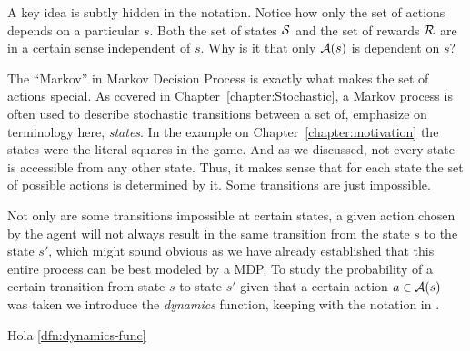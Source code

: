 A key idea is subtly hidden in the notation. Notice how only 
the set of actions depends on a particular $s$. Both the set of 
states $\mathcal{S}$ and the set of rewards $\mathcal{R}$ are in a 
certain sense independent of $s$. Why is it that only 
$\mathcal{A}(s)$ is dependent on $s$?

The ``Markov'' in Markov Decision Process is exactly what makes 
the set of actions special. As covered in 
Chapter~\ref{chapter:Stochastic}, a Markov process is often 
used to describe stochastic transitions between a set of, 
emphasize on terminology here, \textit{states}. In the example 
on Chapter~\ref{chapter:motivation} the states were the literal 
squares in the game. And as we discussed, not every state is 
accessible from any other state. Thus, it makes sense that for 
each state the set of possible actions is determined by it. 
Some transitions are just impossible.

Not only are some transitions impossible at certain states, a 
given action chosen by the agent will not always result in the 
same transition from the state $s$ to the state $s'$, which 
might sound obvious as we have already established that this 
entire process can be best modeled by a MDP. To study the 
probability of a certain transition from state $s$ to state 
$s'$ given that a certain action $a \in \mathcal{A}(s)$ was taken 
we introduce the \textit{dynamics} function, keeping with the 
notation in \cite{SuttonBarto}.


Hola \ref{dfn:dynamics-func}
